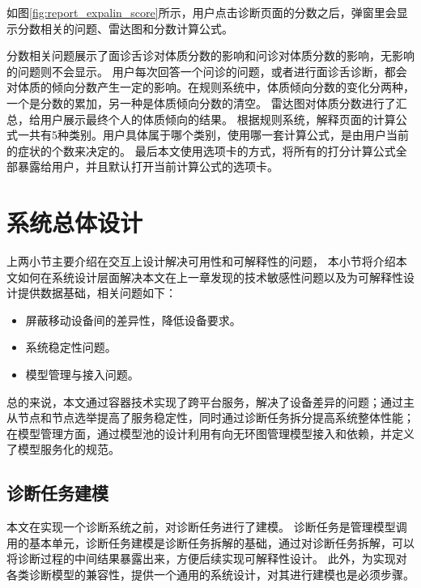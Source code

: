 如图\ref{fig:report_expalin_score}所示，用户点击诊断页面的分数之后，弹窗里会显示分数相关的问题、雷达图和分数计算公式。

分数相关问题展示了面诊舌诊对体质分数的影响和问诊对体质分数的影响，无影响的问题则不会显示。
用户每次回答一个问诊的问题，或者进行面诊舌诊断，都会对体质的倾向分数产生一定的影响。在规则系统中，体质倾向分数的变化分两种，一个是分数的累加，另一种是体质倾向分数的清空。
雷达图对体质分数进行了汇总，给用户展示最终个人的体质倾向的结果。
根据规则系统，解释页面的计算公式一共有5种类别。用户具体属于哪个类别，使用哪一套计算公式，是由用户当前的症状的个数来决定的。
最后本文使用选项卡的方式，将所有的打分计算公式全部暴露给用户，并且默认打开当前计算公式的选项卡。


\section{系统总体设计}
上两小节主要介绍在交互上设计解决可用性和可解释性的问题，
本小节将介绍本文如何在系统设计层面解决本文在上一章发现的技术敏感性问题以及为可解释性设计提供数据基础，相关问题如下：
\begin{itemize}
    \item 屏蔽移动设备间的差异性，降低设备要求。
    \item 系统稳定性问题。
    \item 模型管理与接入问题。
\end{itemize}

总的来说，本文通过容器技术实现了跨平台服务，解决了设备差异的问题；通过主从节点和节点选举提高了服务稳定性，同时通过诊断任务拆分提高系统整体性能；
在模型管理方面，通过模型池的设计利用有向无环图管理模型接入和依赖，并定义了模型服务化的规范。

\subsection{诊断任务建模}
本文在实现一个诊断系统之前，对诊断任务进行了建模。
诊断任务是管理模型调用的基本单元，诊断任务建模是诊断任务拆解的基础，通过对诊断任务拆解，可以将诊断过程的中间结果暴露出来，方便后续实现可解释性设计。
此外，为实现对各类诊断模型的兼容性，提供一个通用的系统设计，对其进行建模也是必须步骤。

